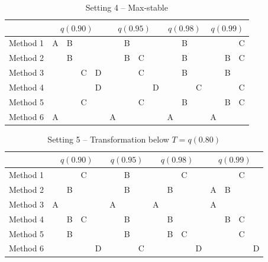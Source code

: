 \documentclass[useAMS,usenatbib,referee]{biomweb}
\begin{document}
\begin{table}[htbp]
  \centering
  \caption{Setting 4 -- Max-stable}
  \label{tbl:mssim}
  \begin{tabular}{|l|cccc|cccc|ccc|ccc|}
    \cline{2-15}
    \multicolumn{1}{c}{} & \multicolumn{4}{|c}{$q(0.90)$} & \multicolumn{4}{|c}{$q(0.95)$} & \multicolumn{3}{|c}{$q(0.98)$} & \multicolumn{3}{|c|}{$q(0.99)$} \\
    \hline
    Method 1 & A & B &   &   &   & B &   &   &   & B &   &   &   & C \\
    \hline
    Method 2 &   & B &   &   &   & B & C &   &   & B &   &   & B & C \\
    \hline
    Method 3 &   &   & C & D &   &   & C &   &   & B &   &   & B &   \\
    \hline
    Method 4 &   &   &   & D &   &   &   & D &   &   & C &   &   & C \\
    \hline
    Method 5 &   &   & C &   &   &   & C &   &   & B &   &   & B & C \\
    \hline
    Method 6 & A &   &   &   & A &   &   &   & A &   &   & A &   &   \\
    \hline
  \end{tabular}
\end{table}

\begin{table}[htbp]
  \centering
  \caption{Setting 5 -- Transformation below $T = q(0.80)$}
  \label{tbl:transsim}
  \begin{tabular}{|l|cccc|ccc|cccc|cccc|}
    \cline{2-16}
    \multicolumn{1}{c}{} & \multicolumn{4}{|c}{$q(0.90)$} & \multicolumn{3}{|c}{$q(0.95)$} & \multicolumn{4}{|c}{$q(0.98)$} & \multicolumn{4}{|c|}{$q(0.99)$} \\
    \hline
    Method 1 &   &   & C &   &   & B &   &   &   & C &   &   &   & C &   \\
    \hline
    Method 2 &   & B &   &   &   & B &   &   & B &   &   & A & B &   &   \\
    \hline
    Method 3 & A &   &   &   & A &   &   & A &   &   &   & A &   &   &   \\
    \hline
    Method 4 &   & B & C &   &   & B &   &   & B &   &   &   & B & C &   \\
    \hline
    Method 5 &   & B &   &   &   & B &   &   & B & C &   &   &   & C &   \\
    \hline
    Method 6 &   &   &   & D &   &   & C &   &   &   & D &   &   &   & D \\
    \hline
  \end{tabular}
\end{table}



\end{document}

